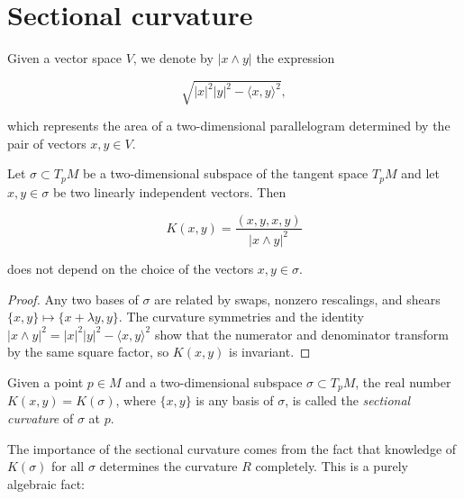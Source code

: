 \section{Sectional curvature}

Given a vector space $V$, we denote by $|x\wedge y|$ the expression

$$
\sqrt{|x|^2|y|^2-\langle x,y\rangle^2},
$$

which represents the area of a two-dimensional parallelogram determined by the
pair of vectors $x,y\in V$.

\begin{proposition}
  \label{prop:dc-ch4-3-1}
  \leanok
  Let $\sigma\subset T_pM$ be a two-dimensional subspace of the tangent space
  $T_pM$ and let $x,y\in\sigma$ be two linearly independent vectors. Then
  
  $$
  K(x,y)=\frac{(x,y,x,y)}{|x\wedge y|^2}
  $$
  
  does not depend on the choice of the vectors $x,y\in\sigma$.
\end{proposition}
\begin{proof}
  \leanok
  \sketch
  Any two bases of $\sigma$ are related by swaps, nonzero rescalings, and shears
  $\{x,y\}\mapsto\{x+\lambda y,y\}$. The curvature symmetries and the identity
  $|x\wedge y|^2=|x|^2|y|^2-\langle x,y\rangle^2$ show that the numerator and
  denominator transform by the same square factor, so $K(x,y)$ is invariant.
\end{proof}

\begin{definition}
  \label{def:dc-ch4-3-2}
  \leanok
  Given a point $p\in M$ and a two-dimensional subspace $\sigma\subset T_pM$, the
  real number $K(x,y)=K(\sigma)$, where $\{x,y\}$ is any basis of $\sigma$, is
  called the \emph{sectional curvature} of $\sigma$ at $p$.
  
  The importance of the sectional curvature comes from the fact that knowledge of
  $K(\sigma)$ for all $\sigma$ determines the curvature $R$ completely. This is a
  purely algebraic fact:
\end{definition}

